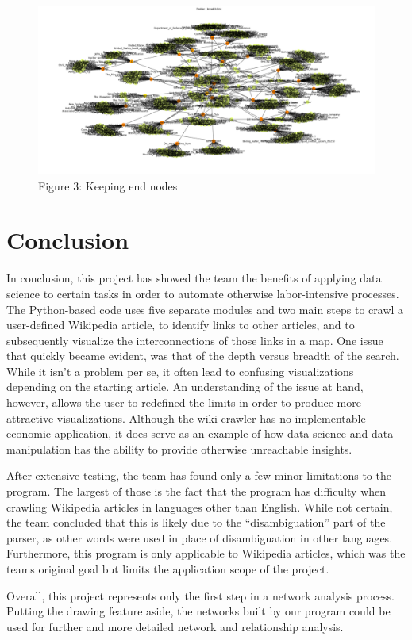 \documentclass[10pt]{article}
\begin{document}
	\begin{figure}[htb]	
			\includegraphics[width=\textwidth]{figure3.png}
   			  	\centering
  			  	\caption{Figure 3: Keeping end nodes}
		\end{figure}

	
	
\section{Conclusion}

In conclusion, this project has showed the team the benefits of applying data science to certain tasks in order to automate otherwise labor-intensive processes. The Python-based code uses five separate modules and two main steps to crawl a user-defined Wikipedia article, to identify links to other articles, and to subsequently visualize the interconnections of those links in a map. One issue that quickly became evident, was that of the depth versus breadth of the search. While it isn’t a problem per se, it often lead to confusing visualizations depending on the starting article. An understanding of the issue at hand, however, allows the user to redefined the limits in order to produce more attractive visualizations. Although the wiki crawler has no implementable economic application, it does serve as an example of how data science and data manipulation has the ability to provide otherwise unreachable insights.
\par \noindent
After extensive testing, the team has found only a few minor limitations to the program. The largest of those is the fact that the program has difficulty when crawling Wikipedia articles in languages other than English. While not certain, the team concluded that this is likely due to the “disambiguation” part of the parser, as other words were used in place of disambiguation in other languages. Furthermore, this program is only applicable to Wikipedia articles, which was the teams original goal but limits the application scope of the project.
\par \noindent
Overall, this project represents only the first step in a network analysis process. Putting the drawing feature aside, the networks built by our program could be used for further and more detailed network and relationship analysis.



\newpage
 

\end{document}
